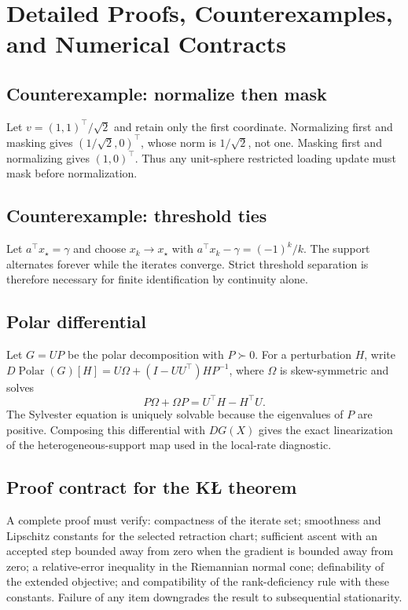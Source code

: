 \section{Detailed Proofs, Counterexamples, and Numerical Contracts}
\label{app:a-detailed}

\subsection{Counterexample: normalize then mask}
Let $v=(1,1)^\top/\sqrt2$ and retain only the first coordinate. Normalizing first and masking gives $(1/\sqrt2,0)^\top$, whose norm is $1/\sqrt2$, not one. Masking first and normalizing gives $(1,0)^\top$. Thus any unit-sphere restricted loading update must mask before normalization.

\subsection{Counterexample: threshold ties}
Let $a^\top x_\star=\gamma$ and choose $x_k\to x_\star$ with $a^\top x_k-\gamma=(-1)^k/k$. The support alternates forever while the iterates converge. Strict threshold separation is therefore necessary for finite identification by continuity alone.

\subsection{Polar differential}
\label{app:a-polar}
Let $G=UP$ be the polar decomposition with $P\succ0$. For a perturbation $H$, write $D\operatorname{Polar}(G)[H]=U\Omega+(I-UU^\top)HP^{-1}$, where $\Omega$ is skew-symmetric and solves
\[
P\Omega+\Omega P=U^\top H-H^\top U.
\]
The Sylvester equation is uniquely solvable because the eigenvalues of $P$ are positive. Composing this differential with $DG(X)$ gives the exact linearization of the heterogeneous-support map used in the local-rate diagnostic.

\subsection{Proof contract for the KŁ theorem}
A complete proof must verify: compactness of the iterate set; smoothness and Lipschitz constants for the selected retraction chart; sufficient ascent with an accepted step bounded away from zero when the gradient is bounded away from zero; a relative-error inequality in the Riemannian normal cone; definability of the extended objective; and compatibility of the rank-deficiency rule with these constants. Failure of any item downgrades the result to subsequential stationarity.
